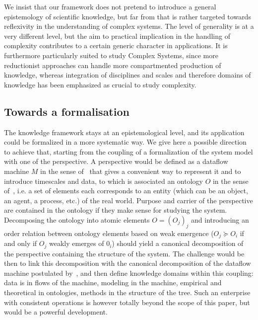 \documentclass[runningheads,a4paper]{llncs2e/llncs}
\begin{document}
We insist that our framework does not pretend to introduce a general epistemology of scientific knowledge, but far from that is rather targeted towards reflexivity in the understanding of complex systems. The level of generality is at a very different level, but the aim to practical implication in the handling of complexity contributes to a certain generic character in applications. It is furthermore particularly suited to study Complex Systems, since more reductionist approaches can handle more compartmented production of knowledge, whereas integration of disciplines and scales and therefore domains of knowledge has been emphasized as crucial to study complexity.


\subsection{Towards a formalisation}

The knowledge framework stays at an epistemological level, and its application could be formalized in a more systematic way. We give here a possible direction to achieve that, starting from the coupling of a formalization of the system model with one of the perspective. A perspective would be defined as a dataflow machine $M$ in the sense of~\cite{golden2012modeling} that gives a convenient way to represent it and to introduce timescales and data, to which is associated an ontology $O$ in the sense of~\cite{livet2010}, i.e. a set of elements each corresponds to an entity (which can be an object, an agent, a process, etc.) of the real world. Purpose and carrier of the perspective are contained in the ontology if they make sense for studying the system. Decomposing the ontology into atomic elements $O=(O_j)_j$ and introducing an order relation between ontology elements based on weak emergence ($O_j\succcurlyeq O_i$ if and only if $O_j$ weakly emerges of $0_i$) should yield a canonical decomposition of the perspective containing the structure of the system. The challenge would be then to link this decomposition with the canonical decomposition of the dataflow machine postulated by~\cite{golden2012modeling}, and then define knowledge domains within this coupling: data is in flows of the machine, modeling in the machine, empirical and theoretical in ontologies, methods in the structure of the tree. Such an enterprise with consistent operations is however totally beyond the scope of this paper, but would be a powerful development.


\vspace{-0.3cm}
\end{document}
